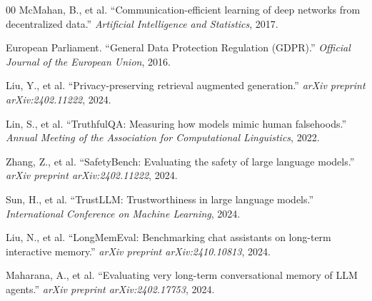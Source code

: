 \documentclass[conference]{IEEEtran}
\begin{document}
\begin{thebibliography}{00}
 McMahan, B., et al. ``Communication-efficient learning of deep networks from decentralized data.'' \textit{Artificial Intelligence and Statistics}, 2017.

 European Parliament. ``General Data Protection Regulation (GDPR).'' \textit{Official Journal of the European Union}, 2016.

 Liu, Y., et al. ``Privacy-preserving retrieval augmented generation.'' \textit{arXiv preprint arXiv:2402.11222}, 2024.

 Lin, S., et al. ``TruthfulQA: Measuring how models mimic human falsehoods.'' \textit{Annual Meeting of the Association for Computational Linguistics}, 2022.

 Zhang, Z., et al. ``SafetyBench: Evaluating the safety of large language models.'' \textit{arXiv preprint arXiv:2402.11222}, 2024.

 Sun, H., et al. ``TrustLLM: Trustworthiness in large language models.'' \textit{International Conference on Machine Learning}, 2024.

 Liu, N., et al. ``LongMemEval: Benchmarking chat assistants on long-term interactive memory.'' \textit{arXiv preprint arXiv:2410.10813}, 2024.

 Maharana, A., et al. ``Evaluating very long-term conversational memory of LLM agents.'' \textit{arXiv preprint arXiv:2402.17753}, 2024.

\end{thebibliography}
\end{document}
